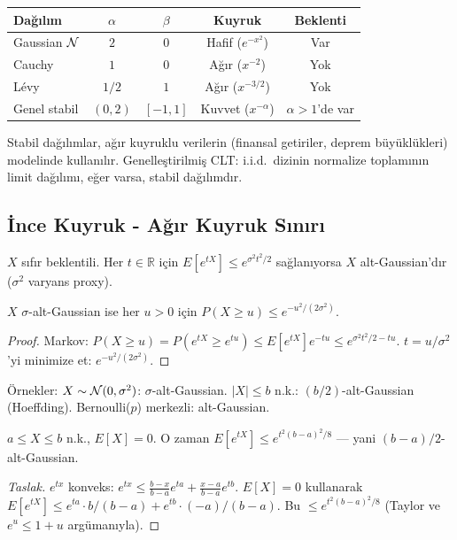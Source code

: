 \begin{center}
\renewcommand{\arraystretch}{1.5}
\small
\begin{tabular}{p{3cm}cccc}
\hline
\textbf{Dağılım} & $\alpha$ & $\beta$ & \textbf{Kuyruk} & \textbf{Beklenti} \\
\hline
Gaussian $\mathcal{N}$ & $2$ & $0$ & Hafif ($e^{-x^2}$) & Var \\
Cauchy & $1$ & $0$ & Ağır ($x^{-2}$) & Yok \\
Lévy & $1/2$ & $1$ & Ağır ($x^{-3/2}$) & Yok \\
Genel stabil & $(0,2)$ & $[-1,1]$ & Kuvvet ($x^{-\alpha}$) & $\alpha>1$'de var \\
\hline
\end{tabular}
\end{center}

Stabil dağılımlar, ağır kuyruklu verilerin (finansal getiriler, deprem büyüklükleri) modelinde kullanılır. Genelleştirilmiş CLT: i.i.d.\ dizinin normalize toplamının limit dağılımı, eğer varsa, stabil dağılımdır.

\subsection{İnce Kuyruk - Ağır Kuyruk Sınırı}

\begin{tanim}\label{def:alt_gaussian}
$X$ sıfır beklentili. Her $t\in\mathbb{R}$ için $E[e^{tX}]\leq e^{\sigma^2t^2/2}$ sağlanıyorsa $X$ alt-Gaussian'dır ($\sigma^2$ varyans proxy).
\end{tanim}

\begin{teorem}\label{thm:alt_gaussian_kuyruk}
$X$ $\sigma$-alt-Gaussian ise her $u>0$ için $P(X\geq u)\leq e^{-u^2/(2\sigma^2)}$.
\end{teorem}
\begin{proof}
Markov: $P(X\geq u)=P(e^{tX}\geq e^{tu})\leq E[e^{tX}]e^{-tu}\leq e^{\sigma^2t^2/2-tu}$. $t=u/\sigma^2$'yi minimize et: $e^{-u^2/(2\sigma^2)}$.
\end{proof}

\noindent Örnekler: $X\sim\mathcal{N}(0,\sigma^2)$: $\sigma$-alt-Gaussian. $|X|\leq b$ n.k.: $(b/2)$-alt-Gaussian (Hoeffding). Bernoulli($p$) merkezli: alt-Gaussian.

\begin{teorem}\label{thm:hoeffding_lemma}
$a\leq X\leq b$ n.k., $E[X]=0$. O zaman $E[e^{tX}]\leq e^{t^2(b-a)^2/8}$ --- yani $(b-a)/2$-alt-Gaussian.
\end{teorem}
\begin{proof}[Taslak]
$e^{tx}$ konveks: $e^{tx}\leq \frac{b-x}{b-a}e^{ta}+\frac{x-a}{b-a}e^{tb}$.
$E[X]=0$ kullanarak $E[e^{tX}]\leq e^{ta}\cdot b/(b-a)+e^{tb}\cdot(-a)/(b-a)$. Bu $\leq e^{t^2(b-a)^2/8}$ (Taylor ve $e^u\leq1+u$ argümanıyla).
\end{proof}

